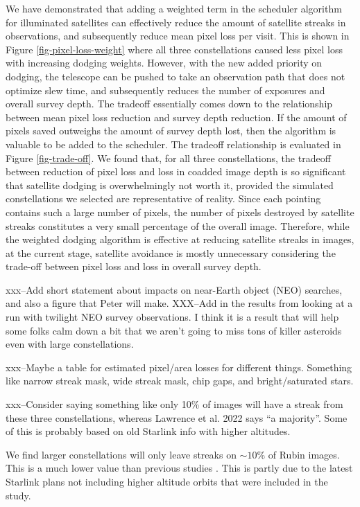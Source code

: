 \documentclass[linenumbers]{aastex631}
\begin{document}
We have demonstrated that adding a weighted term in the scheduler algorithm for illuminated satellites can effectively reduce the amount of satellite streaks in observations, and subsequently reduce mean pixel loss per visit. This is shown in Figure \ref{fig-pixel-loss-weight} where all three constellations caused less pixel loss with increasing dodging weights. However, with the new added priority on dodging, the telescope can be pushed to take an observation path that does not optimize slew time, and subsequently reduces the number of exposures and overall survey depth. The tradeoff essentially comes down to the relationship between mean pixel loss reduction and survey depth reduction. If the amount of pixels saved outweighs the amount of survey depth lost, then the algorithm is valuable to be added to the scheduler. The tradeoff relationship is evaluated in Figure \ref{fig-trade-off}. We found that, for all three constellations, the tradeoff between reduction of pixel loss and loss in coadded image depth is so significant that satellite dodging is overwhelmingly not worth it, provided the simulated constellations we selected are representative of reality. Since each pointing contains such a large number of pixels, the number of pixels destroyed by satellite streaks constitutes a very small percentage of the overall image. Therefore, while the weighted dodging algorithm is effective at reducing satellite streaks in images, at the current stage, satellite avoidance is mostly unnecessary considering the trade-off between pixel loss and loss in overall survey depth.

xxx--Add short statement about impacts on near-Earth object (NEO) searches, and also a figure that Peter will make.
XXX--Add in the results from looking at a run with twilight NEO survey observations. I think it is a result that will help some folks calm down a bit that we aren't going to miss tons of killer asteroids even with large constellations.

xxx--Maybe a table for estimated pixel/area losses for different things. Something like narrow streak mask, wide streak mask, chip gaps, and bright/saturated stars. 

xxx--Consider saying something like only 10\% of images will have a streak from these three constellations, whereas Lawrence et al. 2022 says ``a majority''. Some of this is probably based on old Starlink info with higher altitudes.

We find larger constellations will only leave streaks on $\sim10$\% of Rubin images. This is a much lower value than previous studies \citep{lawrence22, tyson20}. This is partly due to the latest Starlink plans not including higher altitude orbits that were included in the \citet{tyson20} study. %
\end{document}
